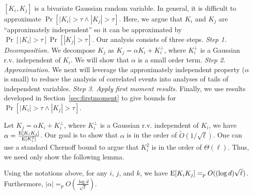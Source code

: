  $[K_i,K_j]$ is a bivariate Gaussian random variable. In general, it is difficult to approximate $\Pr[|K_i| > \tau \wedge |K_j| > \tau]$. Here, we argue that $K_i$ and $K_j$ are ``approximately independent'' so it can be approximated by $\Pr[|K_i| > \tau]\Pr[|K_j| > \tau]$. Our analysis consists of three steps.
\emph{Step 1. Decomposition.}  We decompose $K_j$ as $K_j = \alpha K_i + K_i^{\bot}$, where $K_i^{\bot}$ is a Gaussian r.v. independent of $K_i$. We will show that $\alpha$ is a small order term. \emph{Step 2. Approximation.} We next will leverage the approximately independent property ($\alpha$ is small) to reduce the analysis of correlated events into analyses of tails of independent variables. 
\emph{Step 3. Apply first moment results.} Finally, we use results developed in Section~\ref{sec:firstmoment} to give  bounds for $\Pr[|K_i| > \tau \wedge |K_j| > \tau]$.  


 Let $K_j = \alpha K_i + K_i^{\bot}$, where $K_i^{\bot}$ is a Gaussian r.v. independent of $K_i$, we have
$\alpha = \frac{\mathrm{E}[K_i K_j]}{\mathrm{E}[K^2_i]}$. Our goal is to show that $\alpha$ is in the order of $\tilde O(1/\sqrt{\ell})$. One can use a standard Chernoff bound to argue that $K^2_i$ is in the order of $\Theta(\ell)$. Thus, we need only show the following lemma.  

\begin{lemma}\label{lem:angle} Using the notations above, for any $i$, $j$, and $k$, we have $\mathrm{E}[K_i K_j] =_p O((\log d) \sqrt{\ell})$. Furthermore, $|\alpha| =_p O\left(\frac{\log d}{\sqrt {\ell}}\right).$
\end{lemma}

